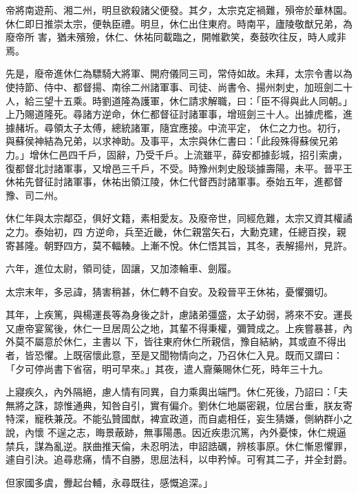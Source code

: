 \begin{pinyinscope}
 帝將南遊荊、湘二州，明旦欲殺諸父便發。其夕，太宗克定禍難，殞帝於華林園。休仁即日推崇太宗，便執臣禮。明旦，休仁出住東府。時南平，廬陵敬猷兄弟，為廢帝所
 害，猶未殯殮，休仁、休祐同載臨之，開帷歡笑，奏鼓吹往反，時人咸非焉。



 先是，廢帝進休仁為驃騎大將軍、開府儀同三司，常侍如故。未拜，太宗令書以為使持節、侍中、都督揚、南徐二州諸軍事、司徒、尚書令、揚州刺史，加班劍二十人，給三望十五乘。時劉道隆為護軍，休仁請求解職，曰：「臣不得與此人同朝。」上乃賜道隆死。尋諸方逆命，休仁都督征討諸軍事，增班劍三十人。出據虎檻，進據赭圻。尋領太子太傅，總統諸軍，隨宜應接。中流平定，
 休仁之力也。初行，與蘇侯神結為兄弟，以求神助。及事平，太宗與休仁書曰：「此段殊得蘇侯兄弟力。」增休仁邑四千戶，固辭，乃受千戶。上流雖平，薛安都據彭城，招引索虜，復都督北討諸軍事，又增邑三千戶，不受。時豫州刺史殷琰據壽陽，未平。晉平王休祐先督征討諸軍事，休祐出領江陵，休仁代督西討諸軍事。泰始五年，進都督豫、司二州。



 休仁年與太宗鄰亞，俱好文籍，素相愛友。及廢帝世，同經危難，太宗又資其權譎之力。泰始初，四
 方逆命，兵至近畿，休仁親當矢石，大勳克建，任總百揆，親寄甚隆。朝野四方，莫不輻輳。上漸不悅。休仁悟其旨，其冬，表解揚州，見許。



 六年，進位太尉，領司徒，固讓，又加漆輪車、劍履。



 太宗末年，多忌諱，猜害稍甚，休仁轉不自安。及殺晉平王休祐，憂懼彌切。



 其年，上疾篤，與楊運長等為身後之計，慮諸弟彊盛，太子幼弱，將來不安。運長又慮帝宴駕後，休仁一旦居周公之地，其輩不得秉權，彌贊成之。上疾嘗暴甚，內外莫不屬意於休仁，主書以
 下，皆往東府休仁所親信，豫自結納，其或直不得出者，皆恐懼。上既宿懷此意，至是又聞物情向之，乃召休仁入見。既而又謂曰：「夕可停尚書下省宿，明可早來。」其夜，遣人齎藥賜休仁死，時年三十九。



 上寢疾久，內外隔絕，慮人情有同異，自力乘輿出端門。休仁死後，乃詔曰：「夫無將之誅，諒惟通典，知咎自引，實有偏介。劉休仁地屬密親，位居台重，朕友寄特深，寵秩兼茂。不能弘贊國猷，裨宣政道，而自處相任，妄生猜嫌，側納群小之說，內懷
 不逞之志，晦景蔽跡，無事陽愚。因近疾患沉篤，內外憂悚，休仁規逼禁兵，謀為亂逆。朕曲推天倫，未忍明法，申詔誥礪，辨核事原。休仁慚恩懼罪，遽自引決。追尋悲痛，情不自勝，思屈法科，以申矜悼。可宥其二子，并全封爵。



 但家國多虞，釁起台輔，永尋既往，感慨追深。」




\end{pinyinscope}
